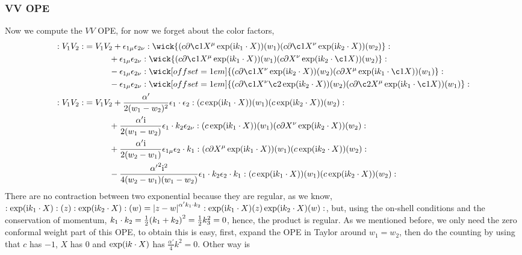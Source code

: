\subsubsection{VV OPE}

Now we compute the $VV$ OPE, for now we forget about the color factors,
\begin{align*}
    \cnord{V_1V_2}&=V_1V_2+\epsilon_{1\mu}\epsilon_{2\nu}\cnord{\wick{(c\partial\c1 X^\mu\exp(\im k_1\cdot X))(w_1)(c\partial\c1 X^\nu\exp(\im k_2\cdot X))(w_2)}}\\
    &\quad\quad\quad+\epsilon_{1\mu}\epsilon_{2\nu}\cnord{\wick{(c\partial\c1 X^\mu\exp(\im k_1\cdot X))(w_1)(c\partial X^\nu\exp(\im k_2\cdot\c1 X))(w_2)}}\\
    &\quad\quad\quad-\epsilon_{1\mu}\epsilon_{2\nu}\cnord{\wick[offset=1em]{(c\partial\c1 X^\nu\exp(\im  k_2\cdot{X}))(w_2)(c\partial {X^\mu}\exp(\im k_1\cdot\c1 X))(w_1)}}\\
    &\quad\quad\quad-\epsilon_{1\mu}\epsilon_{2\nu}\cnord{\wick[offset=1em]{(c\partial\c1 X^\nu\c2\exp(\im  k_2\cdot{X}))(w_2)(c\partial \c2{X^\mu}\exp(\im k_1\cdot\c1 X))(w_1)}}\\
    \cnord{V_1V_2}&=V_1V_2+\frac{\alpha'}{2(w_1-w_2)^2}\epsilon_{1}\cdot\epsilon_{2}\cnord{{(c\exp(\im k_1\cdot X))(w_1)(c\exp(\im k_2\cdot X))(w_2)}}\\
    &\quad\quad\quad+\frac{\alpha'\im}{2(w_1-w_2)}\epsilon_{1}\cdot k_2\epsilon_{2\nu}\cnord{{(c\exp(\im k_1\cdot X))(w_1)(c\partial X^\nu\exp(\im k_2\cdot X))(w_2)}}\\
    &\quad\quad\quad+\frac{\alpha'\im}{2(w_2-w_1)}\epsilon_{1\mu}\epsilon_{2}\cdot k_1\cnord{{(c\partial X^\mu\exp(\im k_1\cdot X))(w_1)(c\exp(\im k_2\cdot X))(w_2)}}\\
    &\quad\quad\quad-\frac{{\alpha'}^2\im^2}{4(w_2-w_1)(w_1-w_2)}\epsilon_{1}\cdot k_2\epsilon_{2}\cdot k_1\cnord{{(c\exp(\im k_1\cdot X))(w_1)(c\exp(\im k_2\cdot X))(w_2)}}
\end{align*}
There are no contraction between two exponential because they are regular, as we know, 
$:\exp(\textnormal{i} k_1\cdot X):\qty(z):\exp(\textnormal{i} k_2\cdot X):(w)=\abs{z-w}^{\alpha'k_1\cdot k_2}:\exp(\textnormal{i} k_1\cdot X)(z)\exp(\textnormal{i} k_2\cdot X)(w):$, 
but, using the on-shell conditions and the conservation of momentum, $k_1\cdot k_2=\frac12\qty(k_1+k_2)^2=\frac12k_3^2=0$, hence, the product is regular. As we mentioned before, we only need the zero conformal weight part of this OPE, to obtain this is easy, first, 
expand the OPE in Taylor around $w_1=w_2$, then do 
the counting by using that $c$ has $-1$, $X$ has $0$ and $\exp(\textnormal{i} k\cdot X)$ has $\frac{\alpha'}{4}k^2=0$. Other way is 
